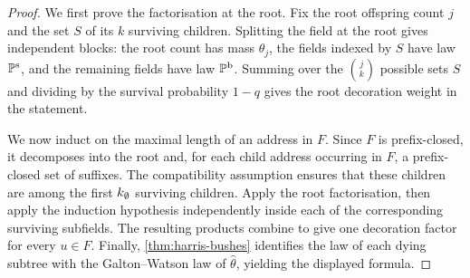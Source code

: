 \begin{proof}
\leanok
We first prove the factorisation at the root. Fix the root offspring count $j$ and the set
$S$ of its $k$ surviving children. Splitting the field at the root gives independent blocks:
the root count has mass $\theta_j$, the fields indexed by $S$ have law $\mathbb{P}^{\mathrm s}$,
and the remaining fields have law $\mathbb{P}^{\mathrm b}$. Summing over the
$\binom{j}{k}$ possible sets $S$ and dividing by the survival probability $1-q$ gives the
root decoration weight in the statement.

We now induct on the maximal length of an address in $F$. Since $F$ is prefix-closed, it
decomposes into the root and, for each child address occurring in $F$, a prefix-closed set
of suffixes. The compatibility assumption ensures that these children are among the first
$k_{\emptyset}$ surviving children. Apply the root factorisation, then apply the induction
hypothesis independently inside each of the corresponding surviving subfields. The
resulting products combine to give one decoration factor for every $u\in F$. Finally,
\cref{thm:harris-bushes} identifies the law of each dying subtree with the Galton--Watson
law of $\hat\theta$, yielding the displayed formula.
\end{proof}
